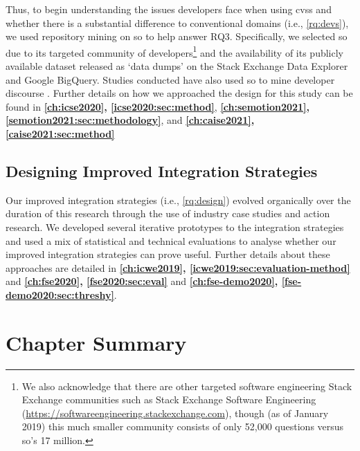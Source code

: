 Thus, to begin understanding the issues developers face when using \glspl{cvs} and whether there is a substantial difference to conventional domains (i.e., \ref{rq:devs}), we used repository mining on \gls{so} to help answer RQ3. Specifically, we selected \gls{so} due to its targeted community of developers\footnote{We also acknowledge that there are other targeted software engineering Stack Exchange communities such as Stack Exchange Software Engineering (\url{https://softwareengineering.stackexchange.com}), though (as of January 2019) this much smaller community consists of only 52,000 questions versus \gls{so}'s 17 million.} and the availability of its publicly available dataset released as `data dumps' on the Stack Exchange Data Explorer and Google BigQuery. Studies conducted have also used \gls{so} to mine developer discourse \citep{Choi:2015wo,Sinha:2013tt,Novielli:2015vda,Rosen:2016uk,Pal:2012te,Bajaj:2014wg,LinaresVasquez:2014vj,Wang:2013ue,Barua:2012gz,Reboucas:2016tw,Allamanis:2013is,Tahir:2018ks}.
Further details on how we approached the design for this study can be found in \textbf{\cref{ch:icse2020}, \cref{icse2020:sec:method}}, \textbf{\cref{ch:semotion2021}, \cref{semotion2021:sec:methodology}}, and \textbf{\cref{ch:caise2021}, \cref{caise2021:sec:method}}

\subsection{Designing Improved Integration Strategies}

Our improved integration strategies (i.e., \ref{rq:design}) evolved organically over the duration of this research through the use of industry case studies and action research. We developed several iterative prototypes to the integration strategies and used a mix of statistical and technical evaluations to analyse whether our improved integration strategies can prove useful. Further details about these approaches are detailed in \textbf{\cref{ch:icwe2019}, \cref{icwe2019:sec:evaluation-method}} and \textbf{\cref{ch:fse2020}, \cref{fse2020:sec:eval}} and \textbf{\cref{ch:fse-demo2020}, \cref{fse-demo2020:sec:threshy}}.

\section{Chapter Summary}


